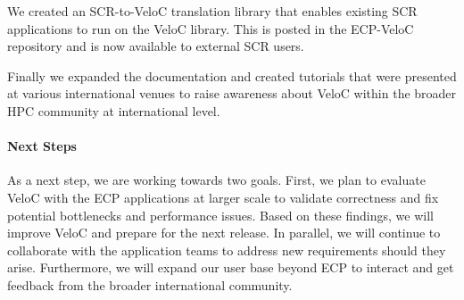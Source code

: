 We created an SCR-to-VeloC translation library that enables existing
SCR applications to run on the VeloC library.  This is posted
in the ECP-VeloC repository and is now available to external SCR users.

Finally we expanded the documentation and created tutorials that were
presented at various international venues to raise awareness about
VeloC within the broader HPC community at international level.

\paragraph{Next Steps}

As a next step, we are working towards two goals. First, we plan to
evaluate VeloC with the ECP applications at larger scale to validate
correctness and fix potential bottlenecks and performance issues.
Based on these findings, we will improve VeloC and prepare for the
next release. In parallel, we will continue to collaborate with the
application teams to address new requirements should they arise.
Furthermore, we will expand our user base beyond ECP to interact and
get feedback from the broader international community.
